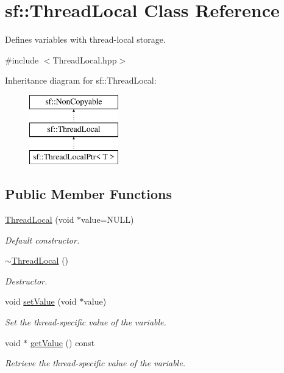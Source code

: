 \hypertarget{classsf_1_1_thread_local}{}\section{sf\+:\+:Thread\+Local Class Reference}
\label{classsf_1_1_thread_local}


Defines variables with thread-\/local storage.  




{\ttfamily \#include $<$Thread\+Local.\+hpp$>$}

Inheritance diagram for sf\+:\+:Thread\+Local\+:\begin{figure}[H]
\begin{center}
\leavevmode
\includegraphics[height=3.000000cm]{classsf_1_1_thread_local}
\end{center}
\end{figure}
\subsection*{Public Member Functions}
\begin{DoxyCompactItemize}
\item 
\hyperlink{classsf_1_1_thread_local_a44ea3c4be4eef118080275cbf4cf04cd}{Thread\+Local} (void $\ast$value=N\+U\+LL)
\begin{DoxyCompactList}\small\item\em Default constructor. \end{DoxyCompactList}\item 
\mbox{\label{classsf_1_1_thread_local_acc612bddfd0f0507b1c5da8b3b8c75c2}} 
\hyperlink{classsf_1_1_thread_local_acc612bddfd0f0507b1c5da8b3b8c75c2}{$\sim$\+Thread\+Local} ()
\begin{DoxyCompactList}\small\item\em Destructor. \end{DoxyCompactList}\item 
void \hyperlink{classsf_1_1_thread_local_ab7e334c83d77644a8e67ee31c3230007}{set\+Value} (void $\ast$value)
\begin{DoxyCompactList}\small\item\em Set the thread-\/specific value of the variable. \end{DoxyCompactList}\item 
void $\ast$ \hyperlink{classsf_1_1_thread_local_ad68823496eb065b4b695c3468fa869bc}{get\+Value} () const
\begin{DoxyCompactList}\small\item\em Retrieve the thread-\/specific value of the variable. \end{DoxyCompactList}\end{DoxyCompactItemize}


